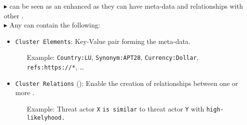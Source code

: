 \begin{multicols*}{3}
        {}

        {
            $\blacktriangleright$ \clusters can be seen as an enhanced \taxonomy as they can have meta-data and relationships with other \clusters.\\
            $\blacktriangleright$ Any \clusters can contain the following:
            \begin{itemize}[noitemsep,topsep=2pt,parsep=0pt,partopsep=0pt]
                \item \texttt{Cluster Elements}: Key-Value pair forming the meta-data.
                \begin{itemize}[noitemsep,topsep=2pt,parsep=0pt,partopsep=0pt]
                    \item[Example:] \texttt{Country:LU}, \texttt{Synonym:APT28}, \texttt{Currency:Dollar}, \texttt{refs:https://*}, …
                \end{itemize}
                \item \texttt{Cluster Relations} (\taggable\synchronisable\distributable): Enable the creation of relationships between one or more \clusters.
                \begin{itemize}[noitemsep,topsep=2pt,parsep=0pt,partopsep=0pt]
                    \item[Example:] Threat actor \texttt{X} \texttt{is similar} to threat actor \texttt{Y} with \texttt{high-likelyhood.}
                \end{itemize}
            \end{itemize}
        }
\end{multicols*}

\newpage

